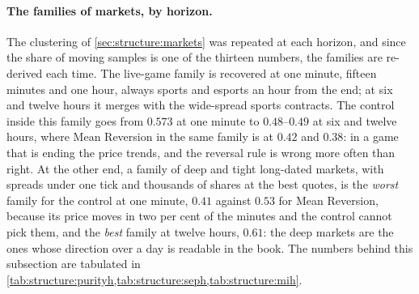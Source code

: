 \paragraph{The families of markets, by horizon.}  The clustering of
\cref{sec:structure:markets} was repeated at each horizon, and since the share of moving
samples is one of the thirteen numbers, the families are re-derived each time.  The
live-game family is recovered at one minute, fifteen minutes and one hour, always sports
and esports an hour from the end; at six and twelve hours it merges with the wide-spread
sports contracts.  The control inside this family goes from $0.573$ at one minute to
$0.48$--$0.49$ at six and twelve hours, where Mean Reversion in the same family is at
$0.42$ and $0.38$: in a game that is ending the price trends, and the reversal rule is
wrong more often than right.  At the other end, a family of deep and tight long-dated
markets, with spreads under one tick and thousands of shares at the best quotes, is the
\emph{worst} family for the control at one minute, $0.41$ against $0.53$ for Mean
Reversion, because its price moves in two per cent of the minutes and the control cannot
pick them, and the \emph{best} family at twelve hours, $0.61$: the deep markets are the
ones whose direction over a day is readable in the book.  The numbers behind this
subsection are tabulated in \cref{tab:structure:purityh,tab:structure:seph,tab:structure:mih}.
